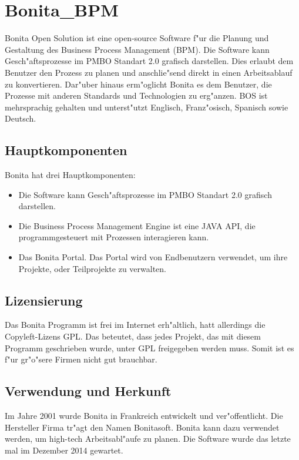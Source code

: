 \section{Bonita_BPM}

Bonita Open Solution ist eine open-source Software f"ur die Planung und Gestaltung des Business Process Management (BPM). Die Software kann Gesch"aftsprozesse im PMBO Standart 2.0 grafisch darstellen. Dies erlaubt dem Benutzer den Prozess zu planen und anschlie"send direkt in einen Arbeitsablauf zu konvertieren. Dar"uber hinaus erm"oglicht Bonita es dem Benutzer, die Prozesse mit anderen Standards und Technologien zu erg"anzen. BOS ist mehrsprachig gehalten und unterst"utzt Englisch, Franz"osisch, Spanisch sowie Deutsch.

\subsection{Hauptkomponenten}

Bonita hat drei Hauptkomponenten:
\begin{itemize}
\item Die Software kann Gesch"aftsprozesse im PMBO Standart 2.0 grafisch darstellen.
\item Die Business Process Management Engine ist eine JAVA API, die programmgesteuert mit Prozessen interagieren kann.
\item Das Bonita Portal. Das Portal wird von Endbenutzern verwendet, um ihre Projekte, oder Teilprojekte zu verwalten.
\end{itemize}

\subsection{Lizensierung}

Das Bonita Programm ist frei im Internet erh"altlich, hatt allerdings die Copyleft-Lizens GPL. Das beteutet, dass jedes Projekt, das mit diesem Programm geschrieben wurde, unter GPL freigegeben werden muss. Somit ist es f"ur gr"o"sere Firmen nicht gut brauchbar. 

\subsection{Verwendung und Herkunft}

Im Jahre 2001 wurde Bonita in Frankreich entwickelt und ver"offentlicht. Die Hersteller Firma tr"agt den Namen Bonitasoft. Bonita kann dazu verwendet werden, um high-tech Arbeitsabl"aufe zu planen. Die Software wurde das letzte mal im Dezember 2014  gewartet.
